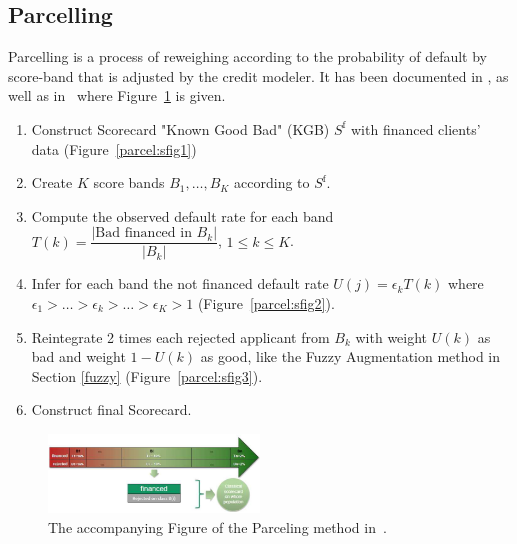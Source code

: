 \subsection{Parcelling} \label{Parceling}

Parcelling is a process of reweighing according to the probability of default by score-band that is adjusted by the credit modeler. It has been documented in \cite{saporta,banasik,RI6}, as well as in~\cite{groupe} where Figure~\ref{fig:parceling} is given.

\begin{enumerate}
\item Construct Scorecard "Known Good Bad" (KGB) $S^{\text{f}}$ with financed clients' data (Figure~\ref{parcel:sfig1})
\item Create $K$ score bands $B_1, \ldots, B_K$ according to $S^{\text{f}}$.
\item Compute the observed default rate for each band $T(k) = \dfrac{|\text{Bad financed in } B_k|}{|B_k|}$, $1 \leq k  \leq K$.
\item Infer for each band the not financed default rate $U(j) = \epsilon_k T(k)$ where $\epsilon_1 > \ldots > \epsilon_k > \ldots > \epsilon_K > 1$ (Figure~\ref{parcel:sfig2}).
\item Reintegrate 2 times each rejected applicant from $B_k$ with weight $U(k)$ as bad and weight $1-U(k)$ as good, like the Fuzzy Augmentation method in Section \ref{fuzzy} (Figure~\ref{parcel:sfig3}).
\item Construct final Scorecard.
\end{enumerate}

\begin{figure}
\centering
\includegraphics[width=0.5\textwidth]{figures/appendix/processusParcelling.png}
\caption{The accompanying Figure of the Parceling method in~\cite{groupe}.}
\label{fig:parceling}
\end{figure}


